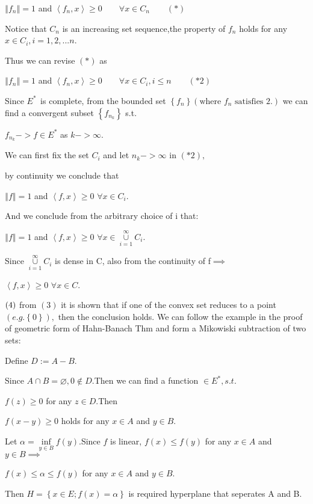 \documentclass{article}
\begin{document}
$\left\Vert f_{n}\right\Vert =1$ and $\left\langle f_{n},x\right\rangle \geq
0\qquad \forall x\in C_{n}\qquad \left( \ast \right) $

Notice that $C_{n}$ is an increasing set sequence,the property of $f_{n}$
holds for any $x\in C_{i},i=1,2,...n$. 

Thus we can revise $\left( \ast \right) $ as

$\left\Vert f_{n}\right\Vert =1$ and $\left\langle f_{n},x\right\rangle \geq
0\qquad \forall x\in C_{i},i\leq n\qquad \left( \ast 2\right) $

Since $E^{\ast \text{ }}$is complete, from the bounded set $\left\{
f_{n}\right\} \left( \text{where }f_{n}\text{ satisfies 2.}\right) $ we can
find a convergent subset $\left\{ f_{n_{k}}\right\} $ s.t. 

$f_{n_{k}}->f\in E^{\ast }$ as $k->\infty .$

We can first fix the set $C_{i}$ and let $n_{k}->\infty $ in $\left( \ast
2\right) ,$

by continuity we conclude that 

$\left\Vert f\right\Vert =1$ and $\left\langle f,x\right\rangle \geq 0$ $%
\forall x\in C_{i}.$

And we conclude from the arbitrary choice of i that:

$\left\Vert f\right\Vert =1$ and $\left\langle f,x\right\rangle \geq 0$ $%
\forall x\in \underset{i=1}{\overset{\infty }{\cup }}C_{i}.$

Since $\underset{i=1}{\overset{\infty }{\cup }}C_{i}$ is dense in C, also
from the continuity of f$\implies $

$\left\langle f,x\right\rangle \geq 0$ $\forall x\in C.$

$\bigskip \left( 4\right) $ from $\left( 3\right) $ it is shown that if one
of the convex set reduces to a point $\left( e.g.\left\{ 0\right\} \right) ,$
then the conclusion holds. We can follow the example in the proof of
geometric form of Hahn-Banach Thm and form a Mikowiski subtraction of two
sets:

Define $D:=A-B.$

Since $A\cap B=\varnothing ,0\notin D.$Then we can find a function $\in
E^{\ast },s.t.$

$f\left( z\right) \geq 0$ for any $z\in D.$Then

$f\left( x-y\right) \geq 0$ holds for any $x\in A$ and $y\in B.$

Let $\alpha =\underset{y\in B}{\inf }f\left( y\right) .$Since $f$ is linear, 
$f\left( x\right) \leq f\left( y\right) $ for any $x\in A$ and $y\in
B\implies $

$f\left( x\right) \leq \alpha \leq f\left( y\right) $ for any $x\in A$ and $%
y\in B$.

Then $H=\left\{ x\in E;f\left( x\right) =\alpha \right\} $ is required
hyperplane that seperates A and B.
\end{document}
